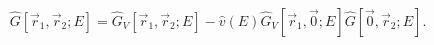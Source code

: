 \begin{equation}
\label{relation1}
\hat{G}[\vec{r}_1, \vec{r}_2; E] = \hat{G}_V[\vec{r}_1, \vec{r}_2; E]
- \hat{v}(E) \hat{G}_V[\vec{r}_1, \vec{0}; E] \hat{G}[\vec{0}, \vec{r}_2; E].
\end{equation}

